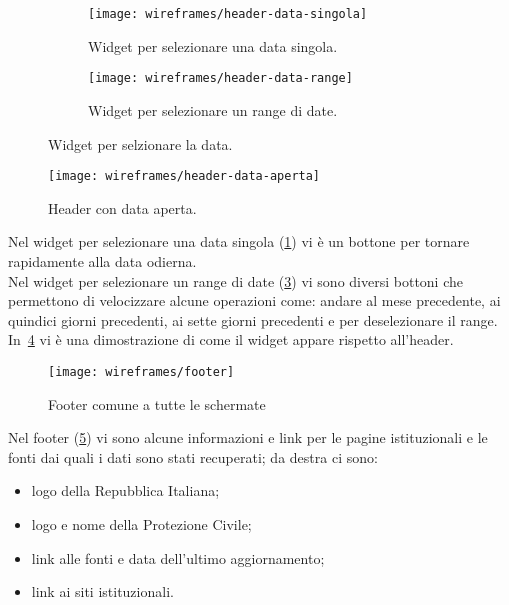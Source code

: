 \begin{figure}[H]
    \begin{subfigure}[b]{0.5\textwidth}
        \centering
        \texttt{[image: wireframes/header-data-singola]}
        \caption{Widget per selezionare una data singola.}
        \label{fig:header-data-singola}
    \end{subfigure}
\hfill
    \begin{subfigure}[b]{0.5\textwidth}
        \centering
        \texttt{[image: wireframes/header-data-range]}
        \caption{Widget per selezionare un range di date.}
        \label{fig:header-data-range}
    \end{subfigure}
    \caption{Widget per selzionare la data.}
\end{figure}

\begin{figure}[H]
    \centering
    \texttt{[image: wireframes/header-data-aperta]}
    \caption{Header con data aperta.}
    \label{fig:header-data-aperta}
\end{figure}

Nel widget per selezionare una data singola (\ref{fig:header-data-singola}) vi è un bottone per tornare rapidamente alla data odierna.\\
Nel widget per selezionare un range di date (\ref{fig:header-data-range}) vi sono diversi bottoni che permettono di velocizzare alcune operazioni come: andare al mese precedente, ai quindici giorni precedenti, ai sette giorni precedenti e per deselezionare il range.\\
In~\ref{fig:header-data-aperta} vi è una dimostrazione di come il widget appare rispetto all'header.

\begin{figure}[H]
    \centering
    \texttt{[image: wireframes/footer]}
    \caption{Footer comune a tutte le schermate}
    \label{fig:footer}
\end{figure}

Nel footer (\ref{fig:footer}) vi sono alcune informazioni e link per le pagine istituzionali e le fonti dai quali i dati sono stati recuperati; da destra ci sono:
\begin{itemize}
    \item logo della Repubblica Italiana;
    \item logo e nome della Protezione Civile;
    \item link alle fonti e data dell'ultimo aggiornamento;
    \item link ai siti istituzionali.
\end{itemize}

